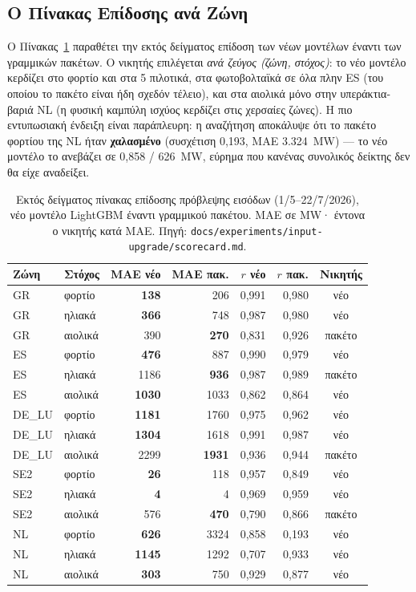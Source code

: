 \subsection{Ο Πίνακας Επίδοσης ανά Ζώνη}
\label{subsec:input-scorecard}

Ο Πίνακας~\ref{tab:input-scorecard} παραθέτει την εκτός δείγματος επίδοση των νέων μοντέλων έναντι των γραμμικών πακέτων. Ο νικητής επιλέγεται \emph{ανά ζεύγος (ζώνη, στόχος)}: το νέο μοντέλο κερδίζει στο φορτίο και στα 5 πιλοτικά, στα φωτοβολταϊκά σε όλα πλην ES (του οποίου το πακέτο είναι ήδη σχεδόν τέλειο), και στα αιολικά μόνο στην υπεράκτια-βαριά NL (η φυσική καμπύλη ισχύος κερδίζει στις χερσαίες ζώνες). Η πιο εντυπωσιακή ένδειξη είναι παράπλευρη: η αναζήτηση αποκάλυψε ότι το πακέτο φορτίου της NL ήταν \textbf{χαλασμένο} (συσχέτιση 0,193, MAE 3.324~MW) --- το νέο μοντέλο το ανεβάζει σε 0,858 / 626~MW, εύρημα που κανένας συνολικός δείκτης δεν θα είχε αναδείξει.

\begin{table}[htbp]
\centering
\caption{Εκτός δείγματος πίνακας επίδοσης πρόβλεψης εισόδων (1/5--22/7/2026), νέο μοντέλο LightGBM έναντι γραμμικού πακέτου. MAE σε MW· έντονα ο νικητής κατά MAE. Πηγή: \texttt{docs/experiments/input-upgrade/scorecard.md}.}
\label{tab:input-scorecard}
\begin{tabular}{@{}llrrrrc@{}}
\toprule
\textbf{Ζώνη} & \textbf{Στόχος} & \textbf{MAE νέο} & \textbf{MAE πακ.} & \textbf{$r$ νέο} & \textbf{$r$ πακ.} & \textbf{Νικητής} \\
\midrule
GR & φορτίο & \textbf{138} & 206 & 0,991 & 0,980 & νέο \\
GR & ηλιακά & \textbf{366} & 748 & 0,987 & 0,980 & νέο \\
GR & αιολικά & 390 & \textbf{270} & 0,831 & 0,926 & πακέτο \\
ES & φορτίο & \textbf{476} & 887 & 0,990 & 0,979 & νέο \\
ES & ηλιακά & 1186 & \textbf{936} & 0,987 & 0,989 & πακέτο \\
ES & αιολικά & \textbf{1030} & 1033 & 0,862 & 0,864 & νέο \\
DE\_LU & φορτίο & \textbf{1181} & 1760 & 0,975 & 0,962 & νέο \\
DE\_LU & ηλιακά & \textbf{1304} & 1618 & 0,991 & 0,987 & νέο \\
DE\_LU & αιολικά & 2299 & \textbf{1931} & 0,936 & 0,944 & πακέτο \\
SE2 & φορτίο & \textbf{26} & 118 & 0,957 & 0,849 & νέο \\
SE2 & ηλιακά & \textbf{4} & 4 & 0,969 & 0,959 & νέο \\
SE2 & αιολικά & 576 & \textbf{470} & 0,790 & 0,866 & πακέτο \\
NL & φορτίο & \textbf{626} & 3324 & 0,858 & 0,193 & νέο \\
NL & ηλιακά & \textbf{1145} & 1292 & 0,707 & 0,933 & νέο \\
NL & αιολικά & \textbf{303} & 750 & 0,929 & 0,877 & νέο \\
\bottomrule
\end{tabular}
\end{table}

